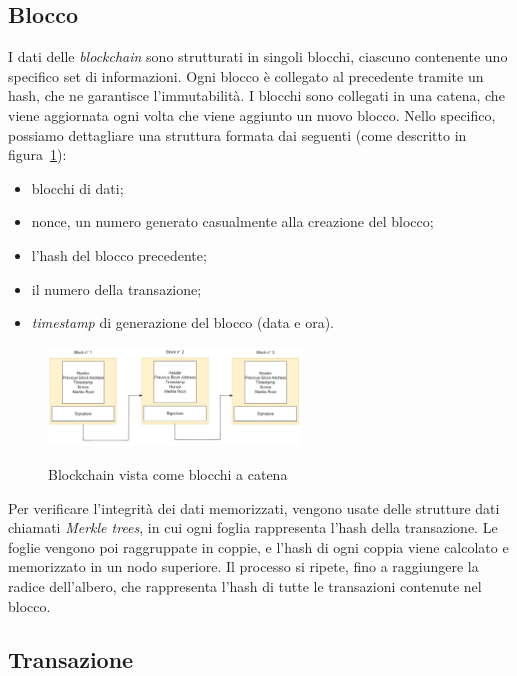 \subsection{Blocco}\label{sec:tecnologie-blockchain-blocco}

I dati delle \textit{blockchain} sono strutturati in singoli blocchi, ciascuno contenente uno specifico set di informazioni.
Ogni blocco è collegato al precedente tramite un hash, che ne garantisce l'immutabilità.
I blocchi sono collegati in una catena, che viene aggiornata ogni volta che viene aggiunto un nuovo blocco.
Nello specifico, possiamo dettagliare una struttura formata dai seguenti (come descritto in figura~\ref{fig:blocco}):
\begin{itemize}
    \item blocchi di dati;
    \item nonce, un numero generato casualmente alla creazione del blocco;
    \item l'hash del blocco precedente;
    \item il numero della transazione;
    \item \textit{timestamp} di generazione del blocco (data e ora).
\end{itemize} 

\begin{figure}[ht]
    \centering
    \includegraphics[width=0.6\textwidth, alt={Blocco all'interno di una blockchain}]{immagini/blocco.png}
    \caption{Blockchain vista come blocchi a catena}\label{fig:blocco}
\end{figure}

Per verificare l'integrità dei dati memorizzati, vengono usate delle strutture dati chiamati \textit{Merkle trees}, in cui ogni foglia rappresenta l'hash della transazione.
Le foglie vengono poi raggruppate in coppie, e l'hash di ogni coppia viene calcolato e memorizzato in un nodo superiore.
Il processo si ripete, fino a raggiungere la radice dell'albero, che rappresenta l'hash di tutte le transazioni contenute nel blocco.

\subsection{Transazione}\label{sec:tecnologie-blockchain-transazione}

